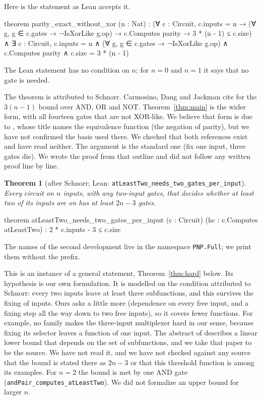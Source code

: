 \documentclass[11pt]{amsart}
\newtheorem{theorem}{Theorem}
\theoremstyle{definition}
\theoremstyle{remark}
\newcommand{\lean}[1]{\texttt{#1}}
\begin{document}
Here is the statement as Lean accepts it.

\begin{leancode}
theorem parity_exact_without_xor (n : Nat) :
    (∀ c : Circuit, c.inputs = n → (∀ g, g ∈ c.gates → ¬IsXorLike g.op) →
        c.Computes parity → 3 * (n - 1) ≤ c.size) ∧
      ∃ c : Circuit, c.inputs = n ∧ (∀ g, g ∈ c.gates → ¬IsXorLike g.op) ∧
        c.Computes parity ∧ c.size = 3 * (n - 1)
\end{leancode}

The Lean statement has no condition on $n$; for $n=0$ and $n=1$ it says that no gate is needed.

The theorem is attributed to Schnorr. Carmosino, Dang and Jackman \cite[Theorem~18]{CDJ26}
cite \cite{Schnorr74} for the $3(n-1)$ bound over AND, OR and NOT. Theorem~\ref{thm:main} is
the wider form, with all fourteen gates that are not XOR-like. We believe that form is due to
\cite{Schnorr76}, whose title names the equivalence function (the negation of parity), but we
have not confirmed the basis used there. We checked that both references exist and have read
neither. The argument is the standard one (fix one input,
three gates die). We wrote the proof from that outline and did not follow any written proof
line by line.

\begin{theorem}[after Schnorr; Lean: \lean{atLeastTwo\_needs\_two\_gates\_per\_input}]\label{thm:two}
Every circuit on $n$ inputs, with any two-input gates, that decides whether at least two of
its inputs are on has at least $2n-3$ gates.
\end{theorem}

\begin{leancode}
theorem atLeastTwo_needs_two_gates_per_input (c : Circuit)
    (hc : c.Computes atLeastTwo) : 2 * c.inputs - 3 ≤ c.size
\end{leancode}

The names of the second development live in the namespace \lean{PNP.Full}; we print them
without the prefix.

This is an instance of a general statement, Theorem~\ref{thm:hard} below. Its hypothesis is our
own formulation. It is modelled on the condition attributed to Schnorr: every two inputs leave
at least three subfunctions, and this survives the fixing of inputs. Ours asks a little more
(dependence on every free input, and a fixing step all the way down to two free inputs), so it
covers fewer functions. For example, no family makes the three-input multiplexer hard in our
sense, because fixing its selector leaves a function of one input. The abstract of
\cite{Schnorr74} describes a linear lower bound that depends on the set of subfunctions, and we
take that paper to be the source. We have not read it, and we have not checked against any
source that the bound is stated there as $2n-3$ or that this threshold function is among its
examples. For $n=2$ the bound is met by one AND gate (\lean{andPair\_computes\_atLeastTwo}).
We did not formalize an upper bound for larger $n$.
\end{document}
